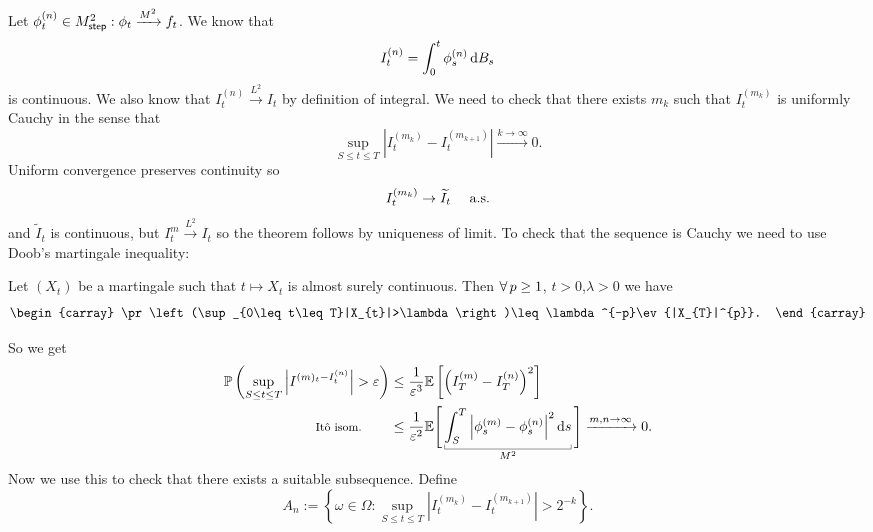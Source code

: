 \documentclass[12pt]{report}
\begin{document}
\begin{fancyproof}
	Let $\phi^{(n)}_{t}\in M^{2}_{\mathsf{step}}:\phi_{t}\xrightarrow{M^{2}}f_{t}$. We know that \\
	\begin{equation*}
		I^{(n)}_{t}=\int_{0}^{t}\phi^{(n)}_{s}\mathop{}\!\mathrm{d} B_{s}
	\end{equation*}
	is continuous. We also know that $I^{(n)}_{t}\xrightarrow{L^{2}}I_{t}$ by definition of \ito{} integral. We need to check that there exists $m_{k}$ such that $I^{(m_{k})}_{t}$ is uniformly Cauchy in the sense that 
	\begin{equation*}
		\sup_{S\leq t\leq T}\left|I^{(m_{k})}_{t}-I^{(m_{k+1})}_{t}\right|\xrightarrow{k\to\infty}0.
	\end{equation*}
	Uniform convergence preserves continuity so
	\begin{equation*}
		I^{(m_{k})}_{t}\to\widetilde{I}_{t}\quad\text{ a.s.}{}
	\end{equation*}
	and $\widetilde{I}_{t}$ is continuous, but $I^{m}_{t}\xrightarrow{L^{2}}I_{t}$ so the theorem follows by uniqueness of limit.
	To check that the sequence is Cauchy we need to use Doob's martingale inequality:
	\begin{proposition}
		Let $(X_{t})$ be a martingale such that $t\mapsto X_{t}$ is almost surely continuous. Then $\forall\, p\geq 1$, $t>0$,$\lambda>0$ we have
		\begin{equation*}
			\begin{carray}
				\pr\left(\sup_{0\leq t\leq T}|X_{t}|>\lambda\right)\leq\lambda^{-p}\ev{|X_{T}|^{p}}.
			\end{carray}
		\end{equation*}
	\end{proposition}
	So we get 
	\begin{align*}
		\pr\left(\sup_{S\leq t\leq T}\left|I^{(m)_{t}-I^{(n)}_{t}}\right|>\varepsilon\right)&\leq\frac{1}{\varepsilon^{3}}\ev{\left(I^{(m)}_{T}-I^{(n)}_{T}\right)^{2}}\\
		\text{\footnotesize \ito{} isom.}\qquad&\leq\frac{1}{\varepsilon^{2}}\evs\Bigg[\ubracketthin{\int_{S}^{T}\left|\phi^{(m)}_{s}-\phi^{(n)}_{s}\right|^{2}\ds}_{M^{2}}\Bigg]\xrightarrow{m,n\to\infty}0.
		\end{align*}
		Now we use this to check that there exists a suitable subsequence. Define
		\begin{equation*}
			A_{n}:=\left\{\omega\in\Omega:\sup_{S\leq t\leq T}\left|I^{(m_{k})}_{t}-I^{(m_{k+1})}_{t}\right|>2^{-k}\right\}.
		\end{equation*}

\end{fancyproof}
\end{document}
